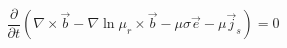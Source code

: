 \begin{equation}
    \frac{\partial}{\partial t} \left(
        \nabla \times \vec{b}
        - \nabla \ln \mu_r \times \vec{b}
        - \mu \sigma \vec{e}
        - \mu \vec{j}_s
    \right)
        = 0
\label{eq:permeability-tdem-dbdt}
\end{equation}
